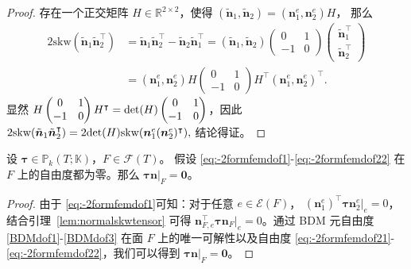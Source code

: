 \begin{proof}
存在一个正交矩阵 $H\in\mathbb R^{2\times2}$，使得 $(\tilde{\boldsymbol{n}}_1,
\tilde{\boldsymbol{n}}_2)=(\boldsymbol{n}_1^e, \boldsymbol{n}_2^e)H$，
那么
\begin{align*}
2\mathrm{skw}(\tilde{\boldsymbol{n}}_1\tilde{\boldsymbol{n}}_2^{\intercal})&=\tilde{\boldsymbol{n}}_1\tilde{\boldsymbol{n}}_2^{\intercal}-\tilde{\boldsymbol{n}}_2\tilde{\boldsymbol{n}}_1^{\intercal}=(\tilde{\boldsymbol{n}}_1, \tilde{\boldsymbol{n}}_2)\begin{pmatrix}
0 & 1 \\
-1 & 0
\end{pmatrix}\begin{pmatrix}
\tilde{\boldsymbol{n}}_1^{\intercal} \\
\tilde{\boldsymbol{n}}_2^{\intercal}
\end{pmatrix}
\\
&=(\boldsymbol{n}_1^e, \boldsymbol{n}_2^e)H\begin{pmatrix}
0 & 1 \\
-1 & 0
\end{pmatrix}H^{\intercal}(\boldsymbol{n}_1^e, \boldsymbol{n}_2^e)^{\intercal}.
\end{align*}
显然 $H\begin{pmatrix}
0 & 1 \\
-1 & 0
\end{pmatrix}H^{\intercal}={\rm det}(H)\begin{pmatrix}
0 & 1 \\
-1 & 0
\end{pmatrix}$，因此
$
2\mathrm{skw}(\tilde{\boldsymbol{n}}_1\tilde{\boldsymbol{n}}_2^{\intercal})=2{\rm det}(H)\mathrm{skw}(\boldsymbol{n}_1^e(\boldsymbol{n}_2^e)^{\intercal}),
$
结论得证。
\end{proof}

\begin{lemma}\label{lem:-2formfemfaceunisolvence}
设 $\boldsymbol{\tau}\in\mathbb P_k(T;\mathbb K)$，$F\in\mathcal F(T)$。
假设 \eqref{eq:-2formfemdof1}-\eqref{eq:-2formfemdof22} 在 $F$ 上的自由度都为零。那么 $\boldsymbol{\tau}\boldsymbol{n}|_F=\boldsymbol{0}$。
\end{lemma}
\begin{proof}
由于 \eqref{eq:-2formfemdof1}可知：对于任意 $e\in\mathcal E(F)$，
$(\boldsymbol{n}_1^e)^{\intercal}\boldsymbol{\tau}\boldsymbol{n}_2^e|_e=0$，
结合引理~\ref{lem:normalskwtensor}
可得
$\boldsymbol{n}_{F,e}^{\intercal}\boldsymbol{\tau}\boldsymbol{n}_F|_e=0$。通过
BDM 元自由度 \eqref{BDMdof1}-\eqref{BDMdof3} 
在面 $F$ 上的唯一可解性以及自由度
\eqref{eq:-2formfemdof21}-\eqref{eq:-2formfemdof22}，我们可以得到
$\boldsymbol{\tau}\boldsymbol{n}|_F=\boldsymbol{0}$。
\end{proof}

